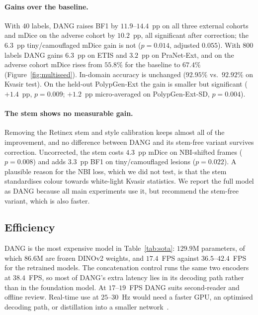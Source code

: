 \documentclass[10pt,twocolumn]{article}
\begin{document}
\paragraph{Gains over the baseline.} With $40$ labels, DANG raises BF1 by $11.9$--$14.4$~pp on all three external cohorts and mDice on the adverse cohort by $10.2$~pp, all significant after correction; the $6.3$~pp tiny/camouflaged mDice gain is not ($p=0.014$, adjusted $0.055$). With $800$ labels DANG gains $6.3$~pp on ETIS and $3.2$~pp on PraNet-Ext, and on the adverse cohort mDice rises from $55.8\%$ for the baseline to $67.4\%$ (Figure~\ref{fig:multiseed}). In-domain accuracy is unchanged ($92.95\%$ vs.\ $92.92\%$ on Kvasir test). On the held-out PolypGen-Ext the gain is smaller but significant ($+1.4$~pp, $p=0.009$; $+1.2$~pp micro-averaged on PolypGen-Ext-SD, $p=0.004$).

\paragraph{The stem shows no measurable gain.} Removing the Retinex stem and style calibration keeps almost all of the improvement, and no difference between DANG and its stem-free variant survives correction. Uncorrected, the stem costs $4.3$~pp mDice on NBI-shifted frames ($p=0.008$) and adds $3.3$~pp BF1 on tiny/camouflaged lesions ($p=0.022$). A plausible reason for the NBI loss, which we did not test, is that the stem standardises colour towards white-light Kvasir statistics. We report the full model as DANG because all main experiments use it, but recommend the stem-free variant, which is also faster.

\subsection{Efficiency}
DANG is the most expensive model in Table~\ref{tab:sota}: $129.9$M parameters, of which $86.6$M are frozen DINOv2 weights, and $17.4$~FPS against $36.5$--$42.4$~FPS for the retrained models. The concatenation control runs the same two encoders at $38.4$~FPS, so most of DANG's extra latency lies in its decoding path rather than in the foundation model. At $17$--$19$~FPS DANG suits second-reader and offline review. Real-time use at $25$--$30$~Hz would need a faster GPU, an optimised decoding path, or distillation into a smaller network~\citep{agnihotri2025difom,agnihotri2026litepi}.
\end{document}
